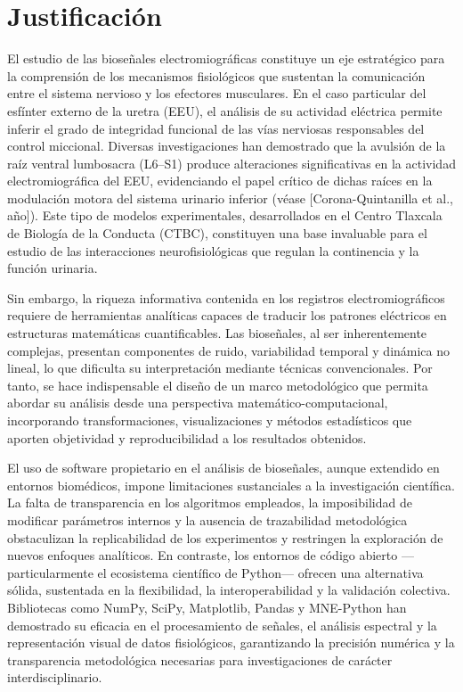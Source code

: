 \section{Justificación}

\noindent El estudio de las bioseñales electromiográficas constituye un eje estratégico para la comprensión de los mecanismos fisiológicos que sustentan la comunicación entre el sistema nervioso y los efectores musculares. En el caso particular del esfínter externo de la uretra (EEU), el análisis de su actividad eléctrica permite inferir el grado de integridad funcional de las vías nerviosas responsables del control miccional. Diversas investigaciones han demostrado que la avulsión de la raíz ventral lumbosacra (L6–S1) produce alteraciones significativas en la actividad electromiográfica del EEU, evidenciando el papel crítico de dichas raíces en la modulación motora del sistema urinario inferior (véase [Corona-Quintanilla et al., año]). Este tipo de modelos experimentales, desarrollados en el Centro Tlaxcala de Biología de la Conducta (CTBC), constituyen una base invaluable para el estudio de las interacciones neurofisiológicas que regulan la continencia y la función urinaria.

Sin embargo, la riqueza informativa contenida en los registros electromiográficos requiere de herramientas analíticas capaces de traducir los patrones eléctricos en estructuras matemáticas cuantificables. Las bioseñales, al ser inherentemente complejas, presentan componentes de ruido, variabilidad temporal y dinámica no lineal, lo que dificulta su interpretación mediante técnicas convencionales. Por tanto, se hace indispensable el diseño de un marco metodológico que permita abordar su análisis desde una perspectiva matemático-computacional, incorporando transformaciones, visualizaciones y métodos estadísticos que aporten objetividad y reproducibilidad a los resultados obtenidos.

\noindent El uso de software propietario en el análisis de bioseñales, aunque extendido en entornos biomédicos, impone limitaciones sustanciales a la investigación científica. La falta de transparencia en los algoritmos empleados, la imposibilidad de modificar parámetros internos y la ausencia de trazabilidad metodológica obstaculizan la replicabilidad de los experimentos y restringen la exploración de nuevos enfoques analíticos. En contraste, los entornos de código abierto —particularmente el ecosistema científico de Python— ofrecen una alternativa sólida, sustentada en la flexibilidad, la interoperabilidad y la validación colectiva. Bibliotecas como NumPy, SciPy, Matplotlib, Pandas y MNE-Python han demostrado su eficacia en el procesamiento de señales, el análisis espectral y la representación visual de datos fisiológicos, garantizando la precisión numérica y la transparencia metodológica necesarias para investigaciones de carácter interdisciplinario.

